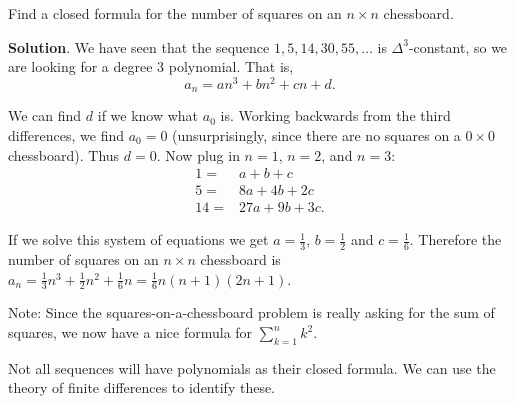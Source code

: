 \documentclass[11pt,]{book}
\theoremstyle{ptxplainnotitle}
\theoremstyle{ptxplaintitle}
\theoremstyle{ptxdefinitionnotitle}
\theoremstyle{ptxdefinitiontitle}
\theoremstyle{ptxdefinitionnotitle}
\theoremstyle{ptxdefinitiontitle}
\theoremstyle{ptxdefinitionnotitle}
\theoremstyle{ptxdefinitiontitle}
\theoremstyle{ptxdefinitiontitlenonumber}
\theoremstyle{ptxdefinitiontitlenonumber}
\numberwithin{equation}{chapter}
\renewcommand{\d}{\displaystyle}
\newcommand{\amp}{&}
\begin{document}
\begin{example}\label{example-16}
\hypertarget{p-376}{}%
Find a closed formula for the number of squares on an \(n \times n\) chessboard.%
\par\smallskip%
\noindent\textbf{Solution}.\hypertarget{solution-45}{}\quad%
\hypertarget{p-377}{}%
We have seen that the sequence \(1, 5, 14, 30, 55, \ldots\) is \(\Delta^3\)-constant, so we are looking for a degree 3 polynomial. That is,%
\begin{equation*}
a_n = an^3 + bn^2 + cn + d.
\end{equation*}
%
\par
\hypertarget{p-378}{}%
We can find \(d\) if we know what \(a_0\) is. Working backwards from the third differences, we find \(a_0 = 0\) (unsurprisingly, since there are no squares on a \(0\times 0\) chessboard). Thus \(d = 0\). Now plug in \(n = 1\), \(n =2\), and \(n =3\):%
\begin{align*}
1 = \amp a + b + c\\
5 = \amp 8a + 4b + 2c\\
14 = \amp 27a + 9b + 3c.
\end{align*}
%
\par
\hypertarget{p-379}{}%
If we solve this system of equations we get \(a = \frac{1}{3}\), \(b = \frac{1}{2}\) and \(c = \frac{1}{6}\). Therefore the number of squares on an \(n \times n\) chessboard is \(a_n = \frac{1}{3}n^3 + \frac{1}{2}n^2 + \frac{1}{6}n = \frac{1}{6}n(n+1)(2n+1)\).%
\end{example}
\hypertarget{p-380}{}%
Note: Since the squares-on-a-chessboard problem is really asking for the sum of squares, we now have a nice formula for \(\d\sum_{k=1}^n k^2\).%
\par
\hypertarget{p-381}{}%
Not all sequences will have polynomials as their closed formula. We can use the theory of finite differences to identify these.%
\end{document}
